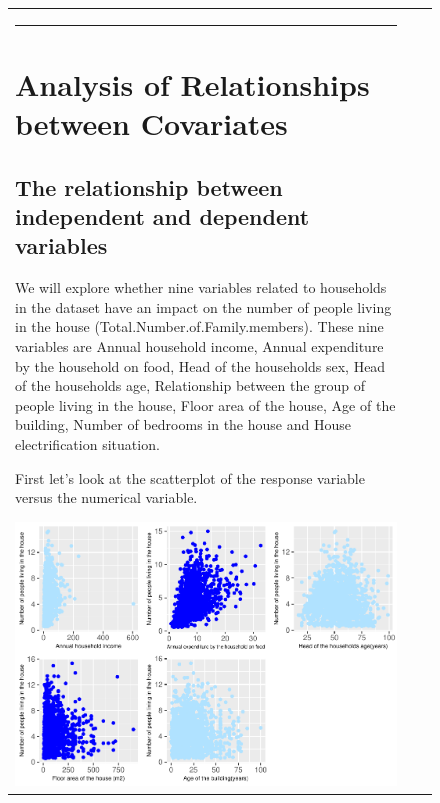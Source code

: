 \documentclass[
]{article}
\begin{document}
\begin{figure}[H]
\begin{table}[H]
\begin{tabular}[t]{lrr}
\begin{center}\rule{0.5\linewidth}{0.5pt}\end{center}

\newpage

\hypertarget{sec:ARC}{%
\section{Analysis of Relationships between Covariates}\label{sec:ARC}}

\hypertarget{the-relationship-between-independent-and-dependent-variables}{%
\subsection{The relationship between independent and dependent
variables}\label{the-relationship-between-independent-and-dependent-variables}}

We will explore whether nine variables related to households in the
dataset have an impact on the number of people living in the house
(Total.Number.of.Family.members). These nine variables are Annual
household income, Annual expenditure by the household on food, Head of
the households sex, Head of the households age, Relationship between the
group of people living in the house, Floor area of the house, Age of the
building, Number of bedrooms in the house and House electrification
situation.

First let's look at the scatterplot of the response variable versus the
numerical variable.

\begin{center}\includegraphics[width=1\linewidth]{Group_01_Project2_demo_files/figure-latex/unnamed-chunk-1-1} \end{center}


\end{tabular}
\end{table}
\end{figure}
\end{document}
